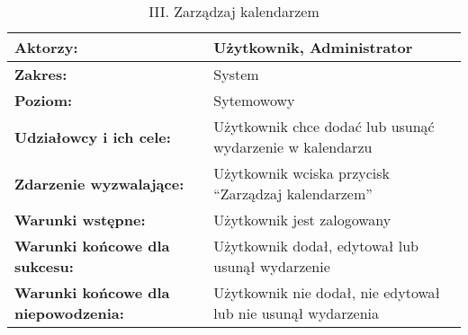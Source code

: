 	\begin{table}[H]
\centering
\caption{III. Zarządzaj kalendarzem}
\label{zarzadzajkalendarzem}
\begin{tabular}{|p{7cm}|p{7cm}|}
  \hline 
  \textbf{Aktorzy:} & Użytkownik, Administrator\\
  \hline
  \textbf{Zakres:} & System \\
	\hline
  \textbf{Poziom:} & Sytemowowy \\
	\hline
  \textbf{Udziałowcy i ich cele: } & Użytkownik chce dodać lub usunąć wydarzenie w kalendarzu \\
	\hline
  \textbf{Zdarzenie wyzwalające: } & Użytkownik wciska przycisk “Zarządzaj kalendarzem” \\
	\hline
  \textbf{Warunki wstępne: } & Użytkownik jest zalogowany
 \\
	\hline
  \textbf{Warunki końcowe dla sukcesu:} & Użytkownik dodał, edytował lub usunął wydarzenie
 \\
	\hline
  \textbf{Warunki końcowe dla niepowodzenia:} & Użytkownik nie dodał, nie edytował lub nie usunął wydarzenia \\
  \hline
\end{tabular} 
\end{table}

